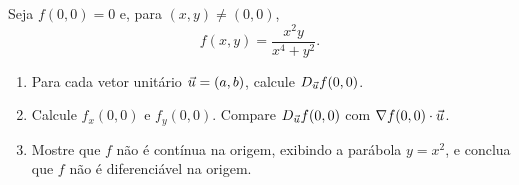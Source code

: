 \documentclass[11pt,a4paper]{article}
\begin{document}
\begin{exercicio}
Seja $f(0,0)=0$ e, para $(x,y)\neq(0,0)$,
\[
f(x,y)=\frac{x^2 y}{x^4+y^2}.
\]
\begin{enumerate}[label=\alph*)]
\item Para cada vetor unitário $\vec{u}=(a,b)$, calcule $D_{\vec{u}} f(0,0)$.
\item Calcule $f_x(0,0)$ e $f_y(0,0)$. Compare $D_{\vec{u}} f(0,0)$ com $\nabla f(0,0)\cdot\vec{u}$.
\item Mostre que $f$ não é contínua na origem, exibindo a parábola $y=x^2$, e conclua que $f$ não é diferenciável na origem.
\end{enumerate}
\end{exercicio}
\end{document}
